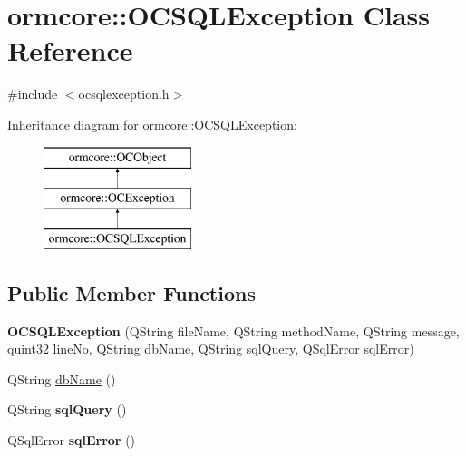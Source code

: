 \hypertarget{classormcore_1_1_o_c_s_q_l_exception}{
\section{ormcore\-:\-:\-O\-C\-S\-Q\-L\-Exception \-Class \-Reference}
\label{classormcore_1_1_o_c_s_q_l_exception}
}


{\ttfamily \#include $<$ocsqlexception.\-h$>$}

\-Inheritance diagram for ormcore\-:\-:\-O\-C\-S\-Q\-L\-Exception\-:\begin{figure}[H]
\begin{center}
\leavevmode
\includegraphics[height=3.000000cm]{classormcore_1_1_o_c_s_q_l_exception}
\end{center}
\end{figure}
\subsection*{\-Public \-Member \-Functions}
\begin{DoxyCompactItemize}
\item 
\hypertarget{classormcore_1_1_o_c_s_q_l_exception_abf284ac4fb4dcba3150f4c6e1b0d7f5f}{
{\bfseries \-O\-C\-S\-Q\-L\-Exception} (\-Q\-String file\-Name, \-Q\-String method\-Name, \-Q\-String message, quint32 line\-No, \-Q\-String db\-Name, \-Q\-String sql\-Query, \-Q\-Sql\-Error sql\-Error)}
\label{classormcore_1_1_o_c_s_q_l_exception_abf284ac4fb4dcba3150f4c6e1b0d7f5f}

\item 
\-Q\-String \hyperlink{classormcore_1_1_o_c_s_q_l_exception_af33c17bf8f9000c94d95c575c63cf936}{db\-Name} ()
\item 
\hypertarget{classormcore_1_1_o_c_s_q_l_exception_a14dc3b97c291099365e39ef4d728dcdb}{
\-Q\-String {\bfseries sql\-Query} ()}
\label{classormcore_1_1_o_c_s_q_l_exception_a14dc3b97c291099365e39ef4d728dcdb}

\item 
\hypertarget{classormcore_1_1_o_c_s_q_l_exception_a880f542cc6f79f49115b429228cc7a82}{
\-Q\-Sql\-Error {\bfseries sql\-Error} ()}
\label{classormcore_1_1_o_c_s_q_l_exception_a880f542cc6f79f49115b429228cc7a82}

\end{DoxyCompactItemize}



